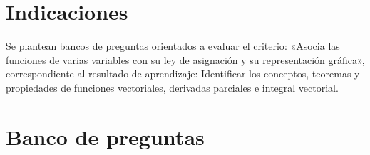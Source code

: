 \documentclass[a4,11pt]{aleph-notas}
\begin{document}
\encabezado

\vspace*{-8mm}
\tableofcontents

\section{Indicaciones}

Se plantean bancos de preguntas orientados a evaluar el {criterio}: «Asocia las funciones de varias variables con su ley de asignación y su representación gráfica», correspondiente al {resultado de aprendizaje}: Identificar los conceptos, teoremas y propiedades de funciones vectoriales, derivadas parciales e integral vectorial.

\section{Banco de preguntas}
\end{document}
